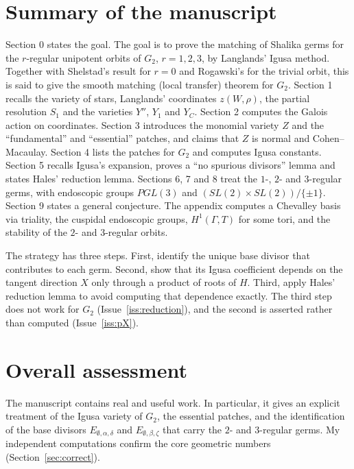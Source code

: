 \documentclass[12pt,letterpaper]{article}
\theoremstyle{definition}
\begin{document}
\section{Summary of the manuscript}

Section 0 states the goal. The goal is to prove the matching of Shalika germs
for the $r$-regular unipotent orbits of $G_2$, $r=1,2,3$, by Langlands' Igusa
method. Together with Shelstad's result for $r=0$ and Rogawski's for the
trivial orbit, this is said to give the smooth matching (local transfer)
theorem for $G_2$. Section 1 recalls the variety of stars, Langlands'
coordinates $z(W,\rho)$, the partial resolution $S_1$ and the varieties $Y''$,
$Y_1$ and $Y_C$. Section 2 computes the Galois action on coordinates.
Section 3 introduces the monomial variety $Z$ and the ``fundamental'' and
``essential'' patches, and claims that $Z$ is normal and Cohen--Macaulay.
Section 4 lists the patches for $G_2$ and computes Igusa constants. Section 5
recalls Igusa's expansion, proves a ``no spurious divisors'' lemma and states
Hales' reduction lemma. Sections 6, 7 and 8 treat the $1$-, $2$- and
$3$-regular germs, with endoscopic groups $PGL(3)$ and
$(SL(2)\times SL(2))/\{\pm1\}$. Section 9 states a general conjecture. The
appendix computes a Chevalley basis via triality, the cuspidal endoscopic
groups, $H^1(\Gamma,T)$ for some tori, and the stability of the $2$- and
$3$-regular orbits.

The strategy has three steps. First, identify the unique base divisor that
contributes to each germ. Second, show that its Igusa coefficient depends on
the tangent direction $X$ only through a product of roots of $H$. Third, apply
Hales' reduction lemma to avoid computing that dependence exactly. The third
step does not work for $G_2$ (Issue~\ref{iss:reduction}), and the second is
asserted rather than computed (Issue~\ref{iss:pX}).

\section{Overall assessment}

The manuscript contains real and useful work. In particular, it gives an
explicit treatment of the Igusa variety of $G_2$, the essential patches, and
the identification of the base divisors $E_{\emptyset,\alpha,\delta}$ and
$E_{\emptyset,\beta,\zeta}$ that carry the $2$- and $3$-regular germs. My
independent computations confirm the core geometric numbers (Section~\ref{sec:correct}).
\end{document}
